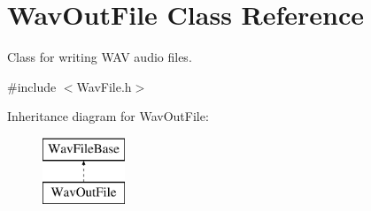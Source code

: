 \hypertarget{class_wav_out_file}{}\section{Wav\+Out\+File Class Reference}
\label{class_wav_out_file}


Class for writing W\+AV audio files.  




{\ttfamily \#include $<$Wav\+File.\+h$>$}

Inheritance diagram for Wav\+Out\+File\+:\begin{figure}[H]
\begin{center}
\leavevmode
\includegraphics[height=2.000000cm]{class_wav_out_file}
\end{center}
\end{figure}
